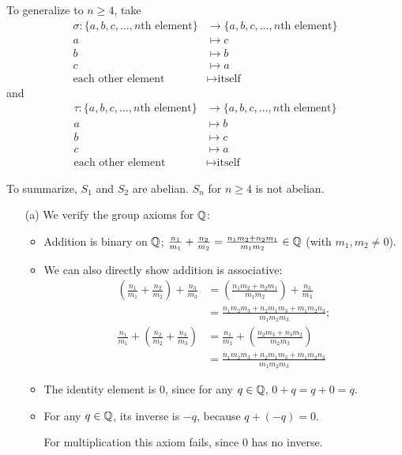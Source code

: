 \documentclass[../UNABRIDGEDalgebraNotesMSRI-UP2016.tex]{subfiles}
\begin{document}
\begin{frame}
To generalize to $n\geq 4$, take 
\begin{align*}
\sigma: \{a,b,c,\dots, \text{$n$th element}\} &\to \{a,b,c, \dots, \text{$n$th element}\} \\
	a &\mapsto c \\
	b &\mapsto b \\
	c &\mapsto a \\
	\text{each other element} &\mapsto \text{itself}
\end{align*}
and 
\begin{align*}
\tau: \{a,b,c,\dots,\text{$n$th element}\} &\to \{a,b,c,\dots,\text{$n$th element}\} \\
	a &\mapsto b \\
	b &\mapsto c \\
	c &\mapsto a \\
	\text{each other element} &\mapsto \text{itself}
\end{align*}

\smallGap
To summarize, $S_1$ and $S_2$ are abelian.  $S_n$ for $n\geq 4$ is not abelian.
\end{frame}

\begin{frame}
\begin{itemize}
\item[(a)] We verify the group axioms for $\mathbb Q$:
\begin{itemize}\footnotesize
	\item Addition is binary on $\mathbb Q$; $\frac{n_1}{m_1}+\frac{n_2}{m_2}=\frac{n_1m_2+n_2m_1}{m_1m_2}\in \mathbb Q$ (with $m_1,m_2\neq 0$).
	\item We can also directly show addition is associative:
	\begin{align*}\textstyle
	\left(\frac{n_1}{m_1}+\frac{n_2}{m_2}\right)+\frac{n_3}{m_3} &= \textstyle \left(\frac{n_1m_2+n_2m_1}{m_1m_2}\right)+\frac{n_3}{m_3} \\
		&= \textstyle \frac{n_1m_2m_3+n_2m_1m_3+m_1m_2n_3}{m_1m_2m_3}; \\
	\textstyle \frac{n_1}{m_1}+\left(\frac{n_2}{m_2}+\frac{n_3}{m_3}\right) &= \textstyle \frac{n_1}{m_1}+\left(\frac{n_2m_3+n_3m_2}{m_2m_3}\right) \\
		&= \textstyle \frac{n_1m_2m_3+n_2m_1m_3+m_1m_2n_3}{m_1m_2m_3}
	\end{align*}
	\item The identity element is $0$, since for any $q\in \mathbb Q$, $0+q=q+0=q$.
	\item For any $q\in \mathbb Q$, its inverse is $-q$, because $q+(-q)=0$.
	
	\smallGap
	For multiplication this axiom fails, since $0$ has no inverse.
	\end{itemize}
\end{itemize}
\end{frame}
\end{document}
